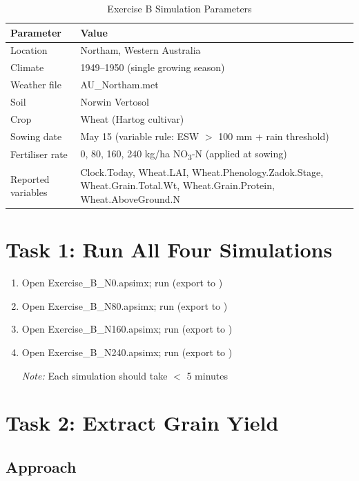 \begin{table}[H]
\centering
\caption{Exercise B Simulation Parameters}
\label{tab:exercise-b-setup}
\begin{tabularx}{\textwidth}{l|X}
\toprule
\textbf{Parameter} & \textbf{Value} \\
\midrule
Location & Northam, Western Australia \\
Climate & 1949--1950 (single growing season) \\
Weather file & AU\_Northam.met \\
Soil & Norwin Vertosol \\
Crop & Wheat (Hartog cultivar) \\
Sowing date & May 15 (variable rule: ESW $>$ 100 mm + rain threshold) \\
Fertiliser rate & 0, 80, 160, 240 kg/ha NO\textsubscript{3}-N (applied at sowing) \\
Reported variables & Clock.Today, Wheat.LAI, Wheat.Phenology.Zadok.Stage, Wheat.Grain.Total.Wt, Wheat.Grain.Protein, Wheat.AboveGround.N \\
\bottomrule
\end{tabularx}
\end{table}

\section{Task 1: Run All Four Simulations}

\begin{enumerate}
  \item Open Exercise\_B\_N0.apsimx; run (export to )
  \item Open Exercise\_B\_N80.apsimx; run (export to )
  \item Open Exercise\_B\_N160.apsimx; run (export to )
  \item Open Exercise\_B\_N240.apsimx; run (export to )
  
  \textit{Note:} Each simulation should take $<$ 5 minutes
\end{enumerate}

\section{Task 2: Extract Grain Yield}

\subsection{Approach}

